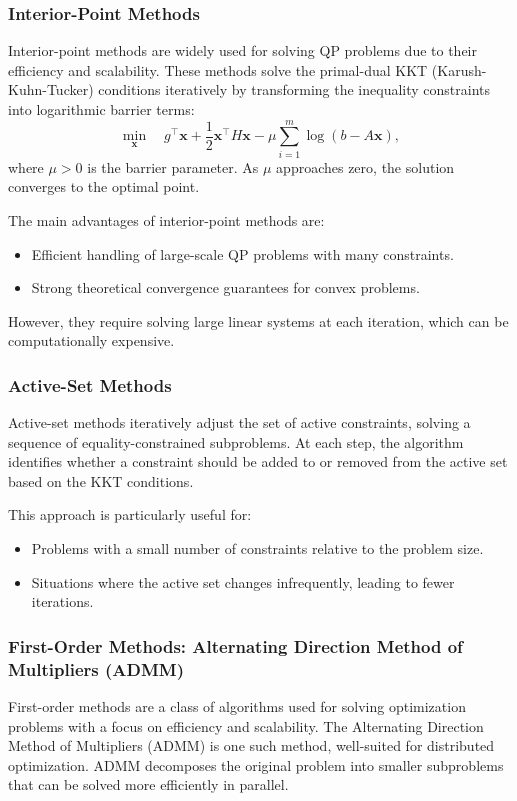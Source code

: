\documentclass{article}
\begin{document}
\subsubsection{Interior-Point Methods}
Interior-point methods are widely used for solving QP problems due to their efficiency and scalability. These methods solve the primal-dual KKT (Karush-Kuhn-Tucker) conditions iteratively by transforming the inequality constraints into logarithmic barrier terms:
\[
\min_{\mathbf{x}} \quad g^\top \mathbf{x} + \frac{1}{2} \mathbf{x}^\top H \mathbf{x} - \mu \sum_{i=1}^{m} \log(b - A \mathbf{x}),
\]
where $\mu > 0$ is the barrier parameter. As $\mu$ approaches zero, the solution converges to the optimal point.

The main advantages of interior-point methods are:
\begin{itemize}
    \item Efficient handling of large-scale QP problems with many constraints.
    \item Strong theoretical convergence guarantees for convex problems.
\end{itemize}
However, they require solving large linear systems at each iteration, which can be computationally expensive.

\subsubsection{Active-Set Methods}
Active-set methods iteratively adjust the set of active constraints, solving a sequence of equality-constrained subproblems. At each step, the algorithm identifies whether a constraint should be added to or removed from the active set based on the KKT conditions.

This approach is particularly useful for:
\begin{itemize}
    \item Problems with a small number of constraints relative to the problem size.
    \item Situations where the active set changes infrequently, leading to fewer iterations.
\end{itemize}

\subsubsection{First-Order Methods: Alternating Direction Method of Multipliers (ADMM)}
First-order methods are a class of algorithms used for solving optimization problems with a focus on efficiency and scalability. The Alternating Direction Method of Multipliers (ADMM) is one such method, well-suited for distributed optimization. ADMM decomposes the original problem into smaller subproblems that can be solved more efficiently in parallel.
\end{document}
